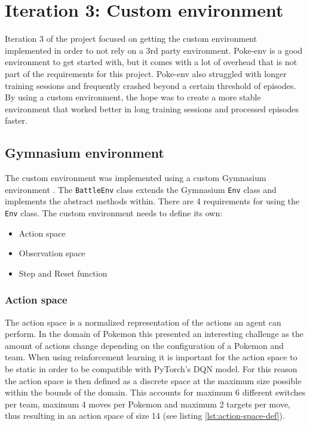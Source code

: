 \section{Iteration 3: Custom environment}
\label{sec:iteration-3-custom-environment}
Iteration 3 of the project focused on getting the custom environment implemented in order to not rely on a 3rd party 
environment. Poke-env is a good environment to get started with, but it comes with a lot of overhead that is not part of 
the requirements for this project. Poke-env also struggled with longer training sessions and frequently crashed beyond a 
certain threshold of episodes. By using a custom environment, the hope was to create a more stable environment that worked
better in long training sessions and processed episodes faster.

\subsection{Gymnasium environment}
The custom environment was implemented using a custom Gymnasium \cite{Gymnasium} environment \cite{GymnasiumCustomEnv}.
The \lstinline|BattleEnv| class extends the Gymnasium \lstinline|Env| class and implements the abstract methods within.
There are 4 requirements for using the \lstinline|Env| class. The custom environment needs to define its own:

\begin{itemize}
    \item Action space
    \item Observation space
    \item Step and Reset function
\end{itemize}

\subsubsection{Action space}
The action space is a normalized representation of the actions an agent can perform. In the domain of Pokemon this presented
an interesting challenge as the amount of actions change depending on the configuration of a Pokemon and team. When using
reinforcement learning it is important for the action space to be static in order to be compatible with PyTorch's DQN model.
For this reason the action space is then defined as a discrete space at the maximum size possible within the bounds of the domain.
This accounts for maximum 6 different switches per team, maximum 4 moves per Pokemon and maximum 2 targets per move, thus
resulting in an action space of size 14 (see listing \ref{lst:action-space-def}).

